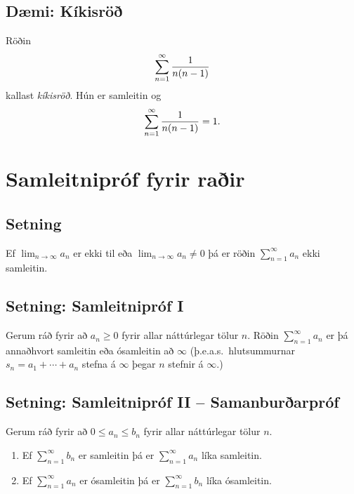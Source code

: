 \documentclass[b5paper,10pt,icelandic]{sphinxmanual}
\begin{document}
\subsection{Dæmi: Kíkisröð}
\label{kafli09:index-8}\label{kafli09:daemi-kikisro}
Röðin
\begin{gather}
\begin{split}\sum_{n=1}^\infty \frac{1}{n(n-1)}\end{split}\notag
\end{gather}
kallast \emph{kíkisröð}. Hún er samleitin og
\begin{gather}
\begin{split}\sum_{n=1}^\infty \frac{1}{n(n-1)} =1.\end{split}\notag
\end{gather}

\section{Samleitnipróf fyrir raðir}
\label{kafli09:index-9}\label{kafli09:samleitniprof-fyrir-rair}

\subsection{Setning}
\label{kafli09:id9}
Ef \(\lim_{n\rightarrow\infty}a_n\) er ekki til eða
\(\lim_{n\rightarrow\infty}a_n\neq 0\) þá er röðin
\(\sum_{n=1}^\infty a_n\) ekki samleitin.


\subsection{Setning: Samleitnipróf I}
\label{kafli09:setning-samleitniprof-i}
Gerum ráð fyrir að \(a_n\geq 0\) fyrir allar náttúrlegar tölur
\(n\). Röðin \(\sum_{n=1}^\infty a_n\) er þá annaðhvort
samleitin eða ósamleitin að \(\infty\) (þ.e.a.s. hlutsummurnar
\(s_n=a_1+\cdots+a_n\) stefna á \(\infty\) þegar \(n\)
stefnir á \(\infty\).)


\subsection{Setning: Samleitnipróf II – Samanburðarpróf}
\label{kafli09:setning-samleitniprof-ii-samanburarprof}
Gerum ráð fyrir að \(0\leq a_n\leq b_n\) fyrir allar náttúrlegar
tölur \(n\).
\begin{enumerate}
\item {} 
Ef \(\sum_{n=1}^\infty b_n\) er samleitin þá er
\(\sum_{n=1}^\infty a_n\) líka samleitin.

\item {} 
Ef \(\sum_{n=1}^\infty a_n\) er ósamleitin þá er
\(\sum_{n=1}^\infty b_n\) líka ósamleitin.

\end{enumerate}
\end{document}
